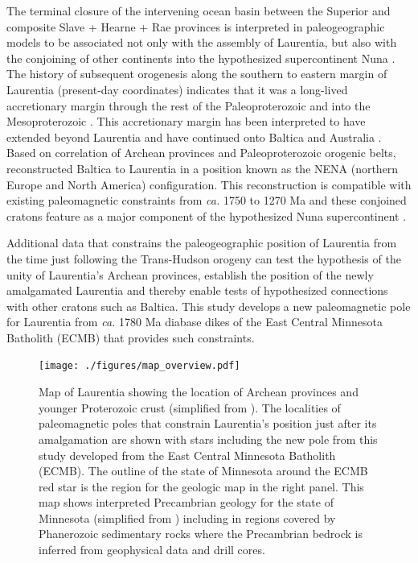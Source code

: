 \documentclass[draft]{agujournal2019}
\begin{document}
The terminal closure of the intervening ocean basin between the Superior and composite Slave + Hearne + Rae provinces is interpreted in paleogeographic models to be associated not only with the assembly of Laurentia, but also with the conjoining of other continents into the hypothesized supercontinent Nuna \cite{Pehrsson2015a}. The history of subsequent orogenesis along the southern to eastern margin of Laurentia (present-day coordinates) indicates that it was a long-lived accretionary margin through the rest of the Paleoproterozoic and into the Mesoproterozoic \cite{Karlstrom2001a, Whitmeyer2007a}. This accretionary margin has been interpreted to have extended beyond Laurentia and have continued onto Baltica and Australia \cite{Karlstrom2001a}. Based on correlation of Archean provinces and Paleoproterozoic orogenic belts,  reconstructed Baltica to Laurentia in a position known as the NENA (northern Europe and North America) configuration. This reconstruction is compatible with existing paleomagnetic constraints from \textit{ca.} 1750 to 1270 Ma \cite{Evans2008a} and these conjoined cratons feature as a major component of the hypothesized Nuna supercontinent \cite{Evans2011a, Zhang2012a}. 

Additional data that constrains the paleogeographic position of Laurentia from the time just following the Trans-Hudson orogeny can test the hypothesis of the unity of Laurentia's Archean provinces, establish the position of the newly amalgamated Laurentia and thereby enable tests of hypothesized connections with other cratons such as Baltica. This study develops a new paleomagnetic pole for Laurentia from \textit{ca.} 1780 Ma diabase dikes of the East Central Minnesota Batholith (ECMB) that provides such constraints.

\begin{figure}[!ht]
\centering
\noindent\texttt{[image: ./figures/map\_overview.pdf]}
\caption{\small{Map of Laurentia showing the location of Archean provinces and younger Proterozoic crust (simplified from ). The localities of paleomagnetic poles that constrain Laurentia's position just after its amalgamation are shown with stars including the new pole from this study developed from the East Central Minnesota Batholith (ECMB). The outline of the state of Minnesota around the ECMB red star is the region for the geologic map in the right panel. This map shows interpreted Precambrian geology for the state of Minnesota (simplified from ) including in regions covered by Phanerozoic sedimentary rocks where the Precambrian bedrock is inferred from geophysical data and drill cores.}}
\label{fig:Laurentia_map}
\end{figure}
\end{document}
